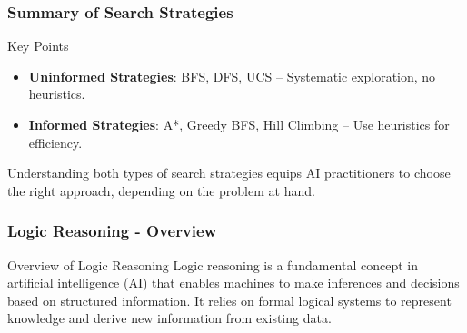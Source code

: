 \documentclass[aspectratio=169]{beamer}
\begin{document}
\begin{frame}[fragile]
  \frametitle{Summary of Search Strategies}
  \begin{block}{Key Points}
    \begin{itemize}
      \item \textbf{Uninformed Strategies}: BFS, DFS, UCS – Systematic exploration, no heuristics.
      \item \textbf{Informed Strategies}: A*, Greedy BFS, Hill Climbing – Use heuristics for efficiency.
    \end{itemize}
  \end{block}
  Understanding both types of search strategies equips AI practitioners to choose the right approach, depending on the problem at hand.
\end{frame}

\begin{frame}[fragile]
    \frametitle{Logic Reasoning - Overview}
    \begin{block}{Overview of Logic Reasoning}
        Logic reasoning is a fundamental concept in artificial intelligence (AI) that enables machines to make inferences and decisions based on structured information. It relies on formal logical systems to represent knowledge and derive new information from existing data.
    \end{block}
\end{frame}
\end{document}
